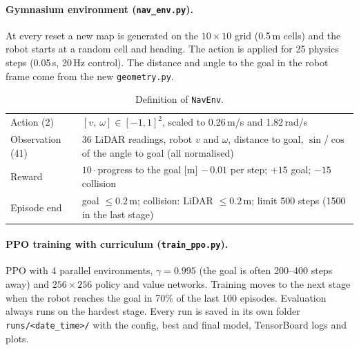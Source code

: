 \documentclass[11pt,a4paper]{article}
\newcommand{\code}[1]{\texttt{#1}}
\begin{document}
\paragraph{Gymnasium environment (\code{nav\_env.py}).} At every reset a new
map is generated on the $10\times10$ grid (0.5\,m cells) and the robot starts
at a random cell and heading. The action is applied for 25 physics steps
(0.05\,s, 20\,Hz control). The distance and angle to the goal in the robot
frame come from the new \code{geometry.py}.

\begin{table}[H]
      \centering\small
      \begin{tabularx}{\textwidth}{@{}l X@{}}
            \toprule
            Action (2)       & $[v,\ \omega]\in[-1,1]^2$, scaled to 0.26\,m/s and 1.82\,rad/s                                                   \\
            Observation (41) & 36 LiDAR readings, robot $v$ and $\omega$, distance to goal, $\sin$/$\cos$ of the angle to goal (all normalised) \\
            Reward           & $10\cdot$progress to the goal [m] $-\,0.01$ per step; $+15$ goal; $-15$ collision                                \\
            Episode end      & goal $\le 0.2$\,m; collision: LiDAR $\le 0.2$\,m; limit 500 steps (1500 in the last stage)                       \\
            \bottomrule
      \end{tabularx}
      \caption{Definition of \code{NavEnv}.}
\end{table}

\paragraph{PPO training with curriculum (\code{train\_ppo.py}).} PPO with
4 parallel environments, $\gamma = 0.995$ (the goal is often 200--400 steps
away) and $256\times256$ policy and value networks. Training moves to the
next stage when the robot reaches the goal in 70\% of the last 100 episodes.
Evaluation always runs on the hardest stage. Every run is saved in its own
folder \code{runs/<date\_time>/} with the config, best and final model,
TensorBoard logs and plots.
\end{document}
